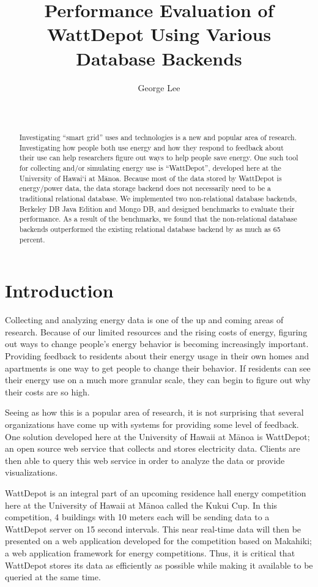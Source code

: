 \documentclass{sig-alternate}
\title{Performance Evaluation of WattDepot Using Various Database Backends}
\author{
      \alignauthor George Lee\\
       \affaddr{University of Hawai`i at M\={a}noa}\\
       \affaddr{Honolulu, HI 96822, USA}\\
       \email{\normalsize{gelee@hawaii.edu}}
}
\begin{document}
\maketitle

\begin{abstract}
Investigating ``smart grid'' uses and technologies is a new and popular area of research.  Investigating how people both use energy and how they respond to feedback about their use can help researchers figure out ways to help people save energy.  One such tool for collecting and/or simulating energy use is ``WattDepot'', developed here at the University of Hawai`i at M\={a}noa.  Because most of the data stored by WattDepot is energy/power data, the data storage backend does not necessarily need to be a traditional relational database.  We implemented two non-relational database backends, Berkeley DB Java Edition and Mongo DB, and designed benchmarks to evaluate their performance.  As a result of the benchmarks, we found that the non-relational database backends outperformed the existing relational database backend by as much as 65 percent.
\end{abstract}

\section{Introduction}

Collecting and analyzing energy data is one of the up and coming areas of research.  Because of our limited resources and the rising costs of energy, figuring out ways to change people's energy behavior is becoming increasingly important.  Providing feedback to residents about their energy usage in their own homes and apartments is one way to get people to change their behavior.  If residents can see their energy use on a much more granular scale, they can begin to figure out why their costs are so high.

Seeing as how this is a popular area of research, it is not surprising that several organizations have come up with systems for providing some level of feedback.  One solution developed here at the University of Hawaii at M\={a}noa is WattDepot\cite{wattdepot}; an open source web service that collects and stores electricity data.  Clients are then able to query this web service in order to analyze the data or provide visualizations.

WattDepot is an integral part of an upcoming residence hall energy competition here at the University of Hawaii at M\={a}noa called the Kukui Cup.  In this competition, 4 buildings with 10 meters each will be sending data to a WattDepot server on 15 second intervals.  This near real-time data will then be presented on a web application developed for the competition based on Makahiki\cite{makahiki}; a web application framework for energy competitions.  Thus, it is critical that WattDepot stores its data as efficiently as possible while making it available to be queried at the same time.
\end{document}
